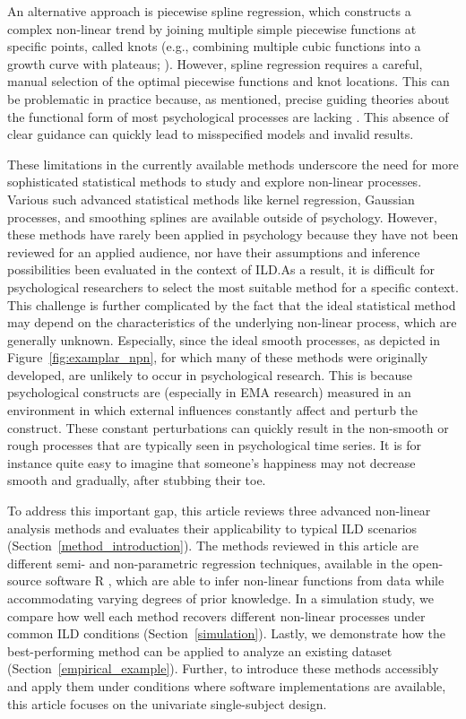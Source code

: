 \documentclass[man, floatsintext]{apa7}
\begin{document}
An alternative approach is piecewise spline regression, which constructs a
complex non-linear trend by joining multiple simple piecewise functions at
specific points, called knots (e.g., combining multiple cubic functions into a
growth curve with plateaus; \textcite{tsay_nonlinear_2019}). However, spline
regression requires a careful, manual selection of the optimal piecewise
functions and knot locations. This can be problematic in practice because, as
mentioned, precise guiding theories about the functional form of most
psychological processes are lacking \parencite{tan_time-varying_2011}. This
absence of clear guidance can quickly lead to misspecified models and invalid
results.

These limitations in the currently available methods underscore the need for
more sophisticated statistical methods to study and explore non-linear
processes. Various such advanced statistical methods like kernel regression,
Gaussian processes, and smoothing splines are available outside of psychology.
However, these methods have rarely been applied in psychology because they have
not been reviewed for an applied audience, nor have their assumptions and
inference possibilities been evaluated in the context of ILD.\@ As a result, it
is difficult for psychological researchers to select the most suitable method
for a specific context. This challenge is further complicated by the fact that
the ideal statistical method may depend on the characteristics of the
underlying non-linear process, which are generally unknown. Especially, since
the ideal smooth processes, as depicted in Figure~\ref{fig:examplar_npn}, for
which many of these methods were originally developed, are unlikely to occur in
psychological research. This is because psychological constructs are
(especially in EMA research) measured in an environment in which external
influences constantly affect and perturb the construct. These constant
perturbations can quickly result in the non-smooth or rough processes that are
typically seen in psychological time series. It is for instance quite easy to
imagine that someone's happiness may not decrease smooth and gradually, after
stubbing their toe.

To address this important gap, this article reviews three advanced non-linear
analysis methods and evaluates their applicability to typical ILD scenarios
(Section~\ref{method_introduction}). The methods reviewed in this article are
different semi- and non-parametric regression techniques, available in the
open-source software R \parencite{R-base}, which are able to infer non-linear
functions from data while accommodating varying degrees of prior knowledge. In
a simulation study, we compare how well each method recovers different
non-linear processes under common ILD conditions (Section~\ref{simulation}).
Lastly, we demonstrate how the best-performing method can be applied to analyze
an existing dataset (Section~\ref{empirical_example}). Further, to introduce
these methods accessibly and apply them under conditions where software
implementations are available, this article focuses on the univariate
single-subject design.
\end{document}
